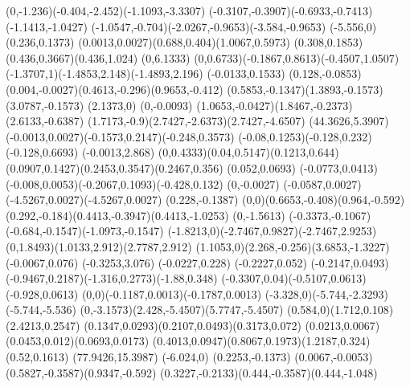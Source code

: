 {    \rcurveto(0,-1.236)(-0.404,-2.452)(-1.1093,-3.3307)
    \rcurveto(-0.3107,-0.3907)(-0.6933,-0.7413)(-1.1413,-1.0427)
    \rcurveto(-1.0547,-0.704)(-2.0267,-0.9653)(-3.584,-0.9653)
    \rlineto(-5.556,0)
    \rlineto(0.236,0.1373)
    \rcurveto(0.0013,0.0027)(0.688,0.404)(1.0067,0.5973)
    \rcurveto(0.308,0.1853)(0.436,0.3667)(0.436,1.024)
    \rlineto(0,6.1333)
    \rcurveto(0,0.6733)(-0.1867,0.8613)(-0.4507,1.0507)
    \rcurveto(-1.3707,1)(-1.4853,2.148)(-1.4893,2.196)
    \rlineto(-0.0133,0.1533)
    \rlineto(0.128,-0.0853)
    \rcurveto(0.004,-0.0027)(0.4613,-0.296)(0.9653,-0.412)
    \rcurveto(0.5853,-0.1347)(1.3893,-0.1573)(3.0787,-0.1573)
    \rlineto(2.1373,0)
    \rlineto(0,-0.0093)
    \rcurveto(1.0653,-0.0427)(1.8467,-0.2373)(2.6133,-0.6387)
    \rcurveto(1.7173,-0.9)(2.7427,-2.6373)(2.7427,-4.6507)
    \moveto(44.3626,5.3907)%
    \rcurveto(-0.0013,0.0027)(-0.1573,0.2147)(-0.248,0.3573)
    \rcurveto(-0.08,0.1253)(-0.128,0.232)(-0.128,0.6693)
    \rlineto(-0.0013,2.868)
    \rcurveto(0,0.4333)(0.04,0.5147)(0.1213,0.644)
    \rcurveto(0.0907,0.1427)(0.2453,0.3547)(0.2467,0.356)
    \rlineto(0.052,0.0693)
    \rlineto(-0.0773,0.0413)
    \rcurveto(-0.008,0.0053)(-0.2067,0.1093)(-0.428,0.132)
    \rlineto(0,-0.0027)
    \rcurveto(-0.0587,0.0027)(-4.5267,0.0027)(-4.5267,0.0027)
    \rlineto(0.228,-0.1387)
    \rcurveto(0,0)(0.6653,-0.408)(0.964,-0.592)
    \rcurveto(0.292,-0.184)(0.4413,-0.3947)(0.4413,-1.0253)
    \rlineto(0,-1.5613)
    \rcurveto(-0.3373,-0.1067)(-0.684,-0.1547)(-1.0973,-0.1547)
    \rcurveto(-1.8213,0)(-2.7467,0.9827)(-2.7467,2.9253)
    \rcurveto(0,1.8493)(1.0133,2.912)(2.7787,2.912)
    \rcurveto(1.1053,0)(2.268,-0.256)(3.6853,-1.3227)
    \rlineto(-0.0067,0.076)
    \rlineto(-0.3253,3.076)
    \rlineto(-0.0227,0.228)
    \rlineto(-0.2227,0.052)
    \rlineto(-0.2147,0.0493)
    \rcurveto(-0.9467,0.2187)(-1.316,0.2773)(-1.88,0.348)
    \rcurveto(-0.3307,0.04)(-0.5107,0.0613)(-0.928,0.0613)
    \rcurveto(0,0)(-0.1187,0.0013)(-0.1787,0.0013)
    \rcurveto(-3.328,0)(-5.744,-2.3293)(-5.744,-5.536)
    \rcurveto(0,-3.1573)(2.428,-5.4507)(5.7747,-5.4507)
    \rcurveto(0.584,0)(1.712,0.108)(2.4213,0.2547)
    \rcurveto(0.1347,0.0293)(0.2107,0.0493)(0.3173,0.072)
    \rcurveto(0.0213,0.0067)(0.0453,0.012)(0.0693,0.0173)
    \rcurveto(0.4013,0.0947)(0.8067,0.1973)(1.2187,0.324)
    \rlineto(0.52,0.1613)
    \closepath
    \moveto(77.9426,15.3987)%
    \rlineto(-6.024,0)
    \rlineto(0.2253,-0.1373)
    \rcurveto(0.0067,-0.0053)(0.5827,-0.3587)(0.9347,-0.592)
    \rcurveto(0.3227,-0.2133)(0.444,-0.3587)(0.444,-1.048)
}
